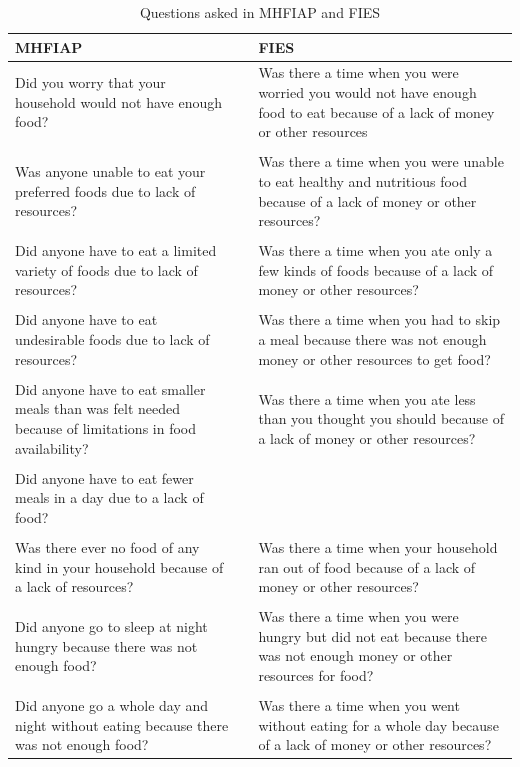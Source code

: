 \begin{table}[H]
  \captionsetup{singlelinecheck = false, justification=justified}
  \caption{Questions asked in MHFIAP and FIES}
  \label{tab:C_10}
  \small
\begin{tabularx}{\textwidth}{
p{}
p{}
p{}}
\toprule
MHFIAP & & FIES \\
\midrule
Did you worry that your household would not have enough food? & & Was there a time when you were worried you would not have enough food to eat because of a lack of money or other resources \\
 & & \\
Was anyone unable to eat your preferred foods due to lack of resources? & & Was there a time when you were unable to eat healthy and nutritious food because of a lack of money or other resources? \\
 & & \\
Did anyone have to eat a limited variety of foods due to lack of resources? & & Was there a time when you ate only a few kinds of foods because of a lack of money or other resources? \\
 & & \\
Did anyone have to eat undesirable foods due to lack of resources? & & Was there a time when you had to skip a meal because there was not enough money or other resources to get food? \\
 & & \\
Did anyone have to eat smaller meals than was felt needed because of limitations in food availability? & & Was there a time when you ate less than you thought you should because of a lack of money or other resources? \\
 & & \\
Did anyone have to eat fewer meals in a day due to a lack of food? & & \\
 & & \\
Was there ever no food of any kind in your household because of a lack of resources? & & Was there a time when your household ran out of food because of a lack of money or other resources? \\
 & & \\
Did anyone go to sleep at night hungry because there was not enough food? & & Was there a time when you were hungry but did not eat because there was not enough money or other resources for food? \\
 & & \\
Did anyone go a whole day and night without eating because there was not enough food? & & Was there a time when you went without eating for a whole day because of a lack of money or other resources? \\
\bottomrule
\end{tabularx}
\end{table}


